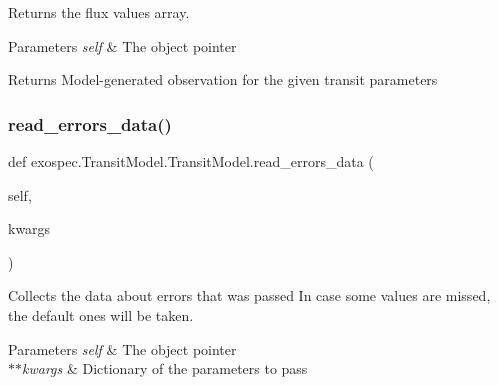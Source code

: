 Returns the flux values array. 


\begin{DoxyParams}{Parameters}
{\em self} & The object pointer \\
\hline
\end{DoxyParams}
\begin{DoxyReturn}{Returns}
Model-\/generated observation for the given transit parameters 
\end{DoxyReturn}
\mbox{\label{classexospec_1_1_transit_model_1_1_transit_model_a0cc09d939ecb7742b40e33ca870e73ad}} 
\subsubsection{\texorpdfstring{read\+\_\+errors\+\_\+data()}{read\_errors\_data()}}
{\footnotesize\ttfamily def exospec.\+Transit\+Model.\+Transit\+Model.\+read\+\_\+errors\+\_\+data (\begin{DoxyParamCaption}\item[{}]{self,  }\item[{}]{kwargs }\end{DoxyParamCaption})}



Collects the data about errors that was passed In case some values are missed, the default ones will be taken. 


\begin{DoxyParams}{Parameters}
{\em self} & The object pointer \\
\hline
{\em $\ast$$\ast$kwargs} & Dictionary of the parameters to pass \\
\hline
\end{DoxyParams}
\mbox{\label{classexospec_1_1_transit_model_1_1_transit_model_ae9e15083b2e989276c67122e8effdc8a}} 
